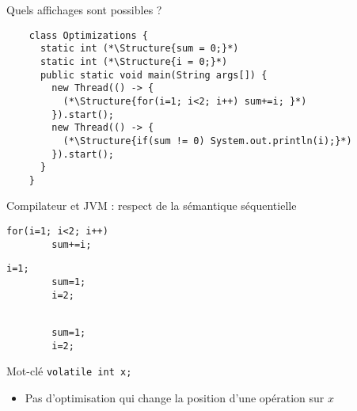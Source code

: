 
\begingroup

\begin{frame}[fragile]{Quels affichages sont possibles ?}

  \begin{lstlisting}
    class Optimizations {
      static int (*\Structure{sum = 0;}*)
      static int (*\Structure{i = 0;}*)
      public static void main(String args[]) {
        new Thread(() -> {
          (*\Structure{for(i=1; i<2; i++) sum+=i; }*)
        }).start();
        new Thread(() -> {
          (*\Structure{if(sum != 0) System.out.println(i);}*)
        }).start();
      }
    }
  \end{lstlisting}
  
  \pause
  \vspace{-2mm}
  \begin{block}{Compilateur et JVM : respect de la sémantique séquentielle}
    \begin{minipage}{.35\textwidth}
      \begin{lstlisting}[gobble=6]
        for(i=1; i<2; i++)
        sum+=i;

      \end{lstlisting}
    \end{minipage}
    \pause
    \hspace{\fill}
    \begin{minipage}{.2\textwidth}
      \begin{lstlisting}[gobble=6]
        i=1;
        sum=1;
        i=2;
      \end{lstlisting}
    \end{minipage}
    \hspace{\fill}
    \pause
    \begin{minipage}{.2\textwidth}
      \begin{lstlisting}[gobble=6]
        
        sum=1;
        i=2;
      \end{lstlisting}
    \end{minipage}
  \end{block}

  \pause
  \begin{exampleblock}{Mot-clé \lstinline{volatile int x;}}
    \begin{itemize}
    \item Pas d'optimisation qui change la position d'une opération sur $x$
    \end{itemize}
  \end{exampleblock}

\end{frame}

\endgroup
\endinput
